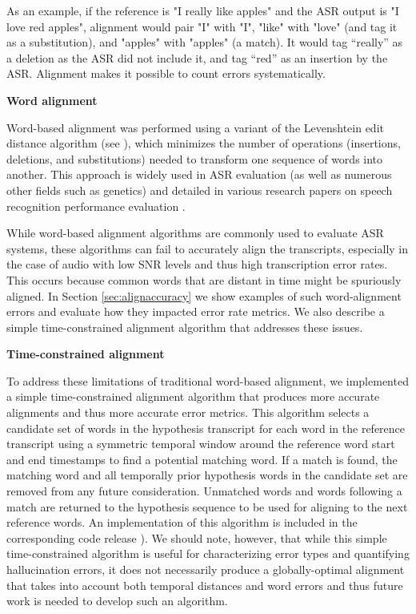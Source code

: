 \documentclass{article}
\begin{document}
As an example, if the reference is "I really like apples" and the ASR output is "I love red apples", alignment would pair "I" with "I", "like" with "love" (and tag it as a substitution), and "apples" with "apples" (a match). It would tag “really” as a deletion as the ASR did not include it, and tag “red” as an insertion by the ASR. Alignment makes it possible to count errors systematically. 

\textbf{Word alignment}

Word-based alignment was performed using a variant of the Levenshtein edit distance algorithm (see \cite{brill2001automatically,jiweri2024}), which minimizes the number of operations (insertions, deletions, and substitutions) needed to transform one sequence of words into another. This approach is widely used in ASR evaluation (as well as numerous other fields such as genetics) and detailed in various research papers on speech recognition performance evaluation \cite{brill2001automatically}. 

While word-based alignment algorithms are commonly used to evaluate ASR systems, these algorithms can fail to accurately align the transcripts, especially in the case of audio with low SNR levels and thus high transcription error rates. This occurs because common words that are distant in time might be spuriously aligned. In Section \ref{sec:alignaccuracy} we show examples of such word-alignment errors and evaluate how they impacted error rate metrics. We also describe a simple time-constrained alignment algorithm that addresses these issues.

\textbf{Time-constrained alignment}

To address these limitations of traditional word-based alignment, we implemented a simple time-constrained alignment algorithm that produces more accurate alignments and thus more accurate error metrics. This algorithm selects a candidate set of words in the hypothesis transcript for each word in the reference transcript using a symmetric temporal window around the reference word start and end timestamps to find a potential matching word. If a match is found, the matching word and all temporally prior hypothesis words in the candidate set are removed from any future consideration. Unmatched words and words following a match are returned to the hypothesis sequence to be used for aligning to the next reference words. An implementation of this algorithm is included in the corresponding code release \cite{coderepo}). We should note, however, that while this simple time-constrained algorithm is useful for characterizing error types and quantifying hallucination errors, it does not necessarily produce a globally-optimal alignment that takes into account both temporal distances and word errors and thus future work is needed to develop such an algorithm.  
\end{document}
